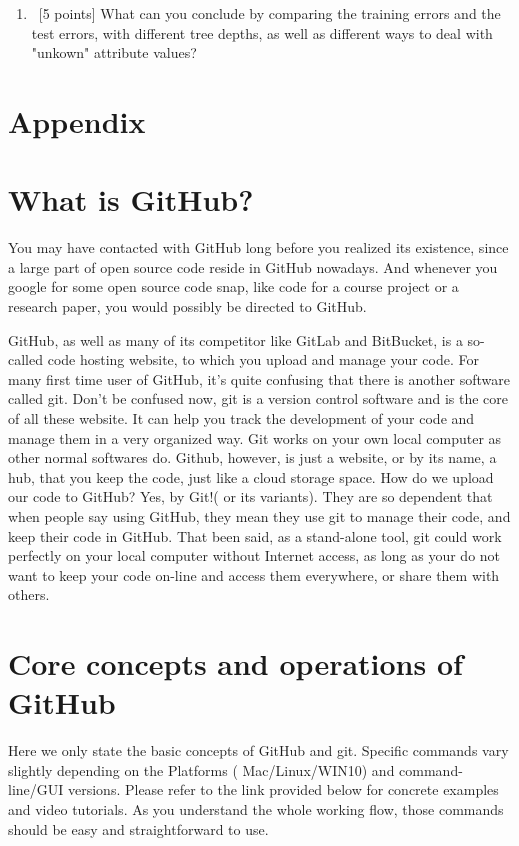 \documentclass[12pt, fullpage,letterpaper]{article}
\begin{document}
\begin{enumerate}
\begin{enumerate}
	
	\item~[5 points] What can you conclude by comparing the training errors and the test errors, with different tree depths, as well as different ways to deal with "unkown" attribute values?
\end{enumerate}
\end{enumerate}

\section*{Appendix}
\section*{What is GitHub?}
You may have contacted with GitHub long before you realized its existence, since a large part of open source code reside in GitHub nowadays. And whenever you google for some open source code snap, like code for a course project or a research paper, you would possibly be directed to GitHub. 

GitHub, as well as  many of its competitor like GitLab and BitBucket, is a so-called code hosting website, to which you upload and manage your code. For many first time user of GitHub, it's quite confusing that there is another software called git. Don't be confused now, git is a version control software and is the core of all these website. It can help you track the development of your code and manage them in a very organized way. Git works on your own local computer as other normal softwares do. Github, however, is just a website, or by its name, a hub, that you keep the code, just like a cloud storage space. How do we upload our code to GitHub? Yes, by Git!( or its variants). They are so dependent that when people say using GitHub, they mean they use git to manage their code, and keep their code in GitHub. That been said, as a stand-alone tool, git could  work perfectly on your local computer without Internet access, as long as your do not want to keep your code on-line and access them everywhere, or share them with others. 



\section*{Core concepts and operations of GitHub}
Here we only state the basic concepts of GitHub and git. Specific commands vary slightly depending on the Platforms ( Mac/Linux/WIN10) and command-line/GUI versions. Please refer to the link provided below for concrete examples and video tutorials. As you understand the whole working flow, those commands should be easy and straightforward to use. 
\end{document}
